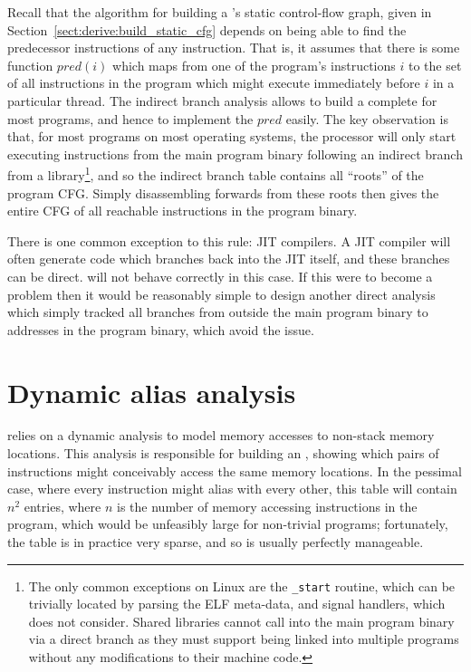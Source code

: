 Recall that the algorithm for building a 's
static control-flow graph, given in
Section~\ref{sect:derive:build_static_cfg} depends on being able to
find the predecessor instructions of any instruction.  That is, it
assumes that there is some function $\mathit{pred}(i)$ which maps from
one of the program's instructions $i$ to the set of all instructions
in the program which might execute immediately before $i$ in a
particular thread.  The indirect branch analysis allows {\technique}
to build a complete  for most programs, and hence to
implement the $\mathit{pred}$ easily.  The key observation is that,
for most programs on most operating systems, the processor will only
start executing instructions from the main program binary following an
indirect branch from a library\footnote{The only common exceptions on
  Linux are the \texttt{\_start} routine, which can be trivially
  located by parsing the ELF meta-data, and signal handlers, which
  {\technique} does not consider.  Shared libraries cannot call into
  the main program binary via a direct branch as they must support
  being linked into multiple programs without any modifications to
  their machine code.  }, and
so the indirect branch table contains all ``roots'' of the program
CFG.  Simply disassembling forwards from these roots then gives the
entire CFG of all reachable instructions in the program binary.

There is one common exception to this rule: JIT compilers\needCite{}.
A JIT compiler will often generate code which branches back into the
JIT itself, and these branches can be direct.  {\Implementation} will
not behave correctly in this case.  If this were to become a problem
then it would be reasonably simple to design another direct analysis
which simply tracked all branches from outside the main program binary
to addresses in the program binary, which avoid the issue.

\section{Dynamic alias analysis}
\label{sect:program_model:dynamic_alias}


{\Technique} relies on a dynamic analysis to model memory accesses to
non-stack memory locations.  This analysis is responsible for building
an , showing which pairs of instructions
might conceivably access the same memory locations.  In the pessimal
case, where every instruction might alias with every other, this table
will contain $n^2$ entries, where $n$ is the number of memory
accessing instructions in the program, which would be unfeasibly large
for non-trivial programs; fortunately, the table is in practice very
sparse, and so is usually perfectly manageable.  

